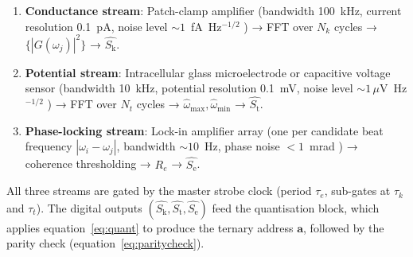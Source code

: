 \documentclass[11pt,twocolumn,a4paper]{article}
\theoremstyle{definition}
\theoremstyle{remark}
\newcommand{\Sk}{S_{\mathrm{k}}}
\newcommand{\St}{S_{\mathrm{t}}}
\newcommand{\Se}{S_{\mathrm{e}}}
\begin{document}
\begin{enumerate}[nosep, label=(\roman*)]
\item \textbf{Conductance stream}: Patch-clamp amplifier (bandwidth 100~kHz,
  current resolution 0.1~pA, noise level $\sim 1$~fA~Hz$^{-1/2}$ \citep{sakmann1995})
  → FFT over $N_k$ cycles → $\{|G(\omega_j)|^2\}$ → $\hat{\Sk}$.
\item \textbf{Potential stream}: Intracellular glass microelectrode or capacitive
  voltage sensor (bandwidth 10~kHz, potential resolution 0.1~mV, noise level
  $\sim 1\,\mu$V~Hz$^{-1/2}$ \citep{numberger1996}) → FFT over $N_t$ cycles
  → $\hat{\omega}_{\max}, \hat{\omega}_{\min}$ → $\hat{\St}$.
\item \textbf{Phase-locking stream}: Lock-in amplifier array (one per candidate
  beat frequency $|\omega_i - \omega_j|$, bandwidth $\sim 10$~Hz, phase noise
  $< 1$~mrad \citep{scofield1994}) → coherence thresholding → $R_e$ → $\hat{\Se}$.
\end{enumerate}

All three streams are gated by the master strobe clock (period $\tau_e$,
sub-gates at $\tau_k$ and $\tau_t$). The digital outputs $(\hat{\Sk}, \hat{\St},
\hat{\Se})$ feed the quantisation block, which applies equation~\eqref{eq:quant}
to produce the ternary address $\mathbf{a}$, followed by the parity check
(equation~\eqref{eq:paritycheck}).
\end{document}
